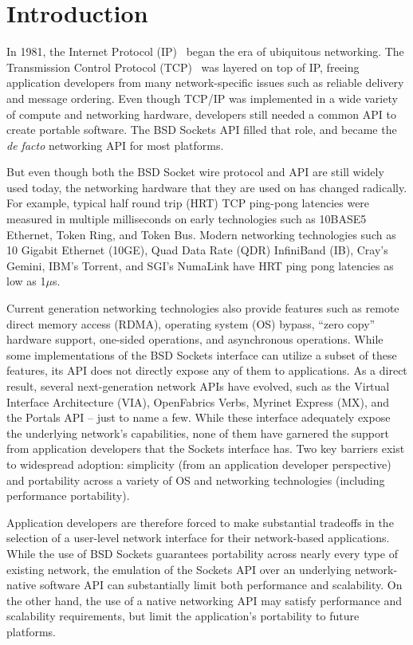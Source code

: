 \section{Introduction}
\label{sec:introduction}


In 1981, the Internet Protocol (IP)~\cite{RFC791} began the era of
ubiquitous networking.  The Transmission Control Protocol
(TCP)~\cite{RFC793} was layered on top of IP, freeing application
developers from many network-specific issues such as reliable delivery
and message ordering.  Even though TCP/IP was implemented in a wide
variety of compute and networking hardware, developers still needed a
common API to create portable software.
%
The BSD Sockets API filled that role, and became the {\em de facto}
networking API for most platforms.  

But even though both the BSD Socket wire protocol and API are still
widely used today, the networking hardware that they are used on has
changed radically.
%
For example, typical half round trip (HRT) TCP ping-pong latencies
were measured in multiple milliseconds on early technologies such as
10BASE5 Ethernet, Token Ring, and Token Bus.
%
Modern networking technologies such as 10 Gigabit Ethernet (10GE), Quad Data Rate
(QDR) InfiniBand (IB), Cray's Gemini, IBM's Torrent, 
and SGI's NumaLink have HRT ping pong latencies as low as 
1$\mu$s.

Current generation networking technologies also provide features such
as remote direct memory access (RDMA), operating system (OS) bypass,
``zero copy'' hardware support, one-sided operations, and asynchronous
operations.
%
While some implementations of the BSD Sockets interface can utilize a
subset of these features, its API does not directly expose any of them
to applications.
%
As a direct result, several next-generation network APIs have evolved,
such as the Virtual Interface Architecture (VIA), OpenFabrics Verbs,
Myrinet Express (MX), and the Portals API -- just to name a few.
%
While these interface adequately expose the underlying network's
capabilities, none of them have garnered the support from application
developers that the Sockets interface has.
%
Two key barriers exist to widespread adoption: simplicity (from an
application developer perspective) and portability across a variety of
OS and networking technologies (including performance portability).

Application developers are therefore forced to make substantial
tradeoffs in the selection of a user-level network interface for their
network-based applications.
%
While the use of BSD Sockets guarantees portability across nearly
every type of existing network, the emulation of the Sockets API over
an underlying network-native software API can substantially limit both
performance and scalability.
%
On the other hand, the use of a native networking API may satisfy
performance and scalability requirements, but limit the application's
portability to future platforms.

